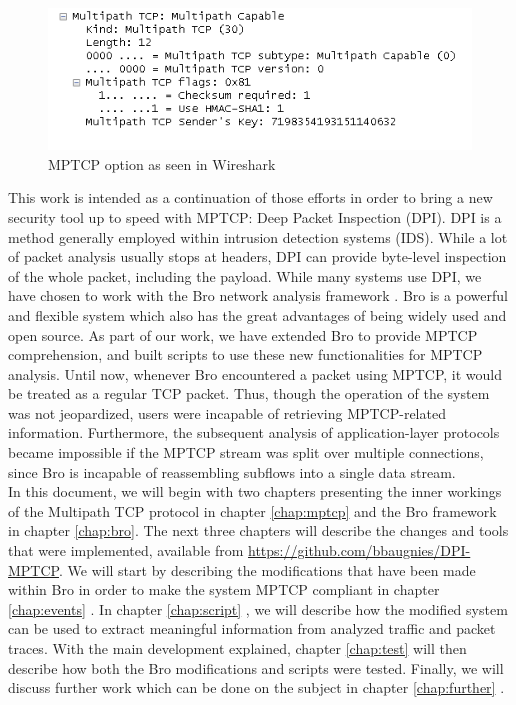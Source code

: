 \begin{figure}[!t]
\centering
\includegraphics[width=\columnwidth]{Figures/wiresharkdemo.png}
\caption{MPTCP option as seen in Wireshark}
\label{pic:wshark demo}
\end{figure}

This work is intended as a continuation of those efforts in order to bring a new security tool up to speed with MPTCP: Deep Packet Inspection (DPI). DPI is a method generally employed within intrusion detection systems (IDS). While a lot of packet analysis usually stops at headers, DPI can provide byte-level inspection of the whole packet, including the payload. While many systems use DPI, we have chosen to work with the Bro network analysis framework \cite{bro}. Bro is a powerful and flexible system which also has the great advantages of being widely used and open source. As part of our work, we have extended Bro to provide MPTCP comprehension, and built scripts to use these new functionalities for MPTCP analysis. Until now, whenever Bro encountered a packet using MPTCP, it would be treated as a regular TCP packet. Thus, though the operation of the system was not jeopardized, users were incapable of retrieving MPTCP-related information. Furthermore, the subsequent analysis of application-layer protocols became impossible if the MPTCP stream was split over multiple connections, since Bro is incapable of reassembling subflows into a single data stream. \\

In this document, we will begin with two chapters presenting the inner workings of the Multipath TCP protocol in chapter \ref{chap:mptcp} and the Bro framework in chapter \ref{chap:bro}. The next three chapters will describe the changes and tools that were implemented, available from \url{https://github.com/bbaugnies/DPI-MPTCP}. We will start by describing the modifications that have been made within Bro in order to make the system MPTCP compliant in chapter \ref{chap:events} . In chapter \ref{chap:script} , we will describe how the modified system can be used to extract meaningful information from analyzed traffic and packet traces. With the main development explained, chapter \ref{chap:test} will then describe how both the Bro modifications and scripts were tested. Finally, we will discuss further work which can be done on the subject in chapter \ref{chap:further} .
